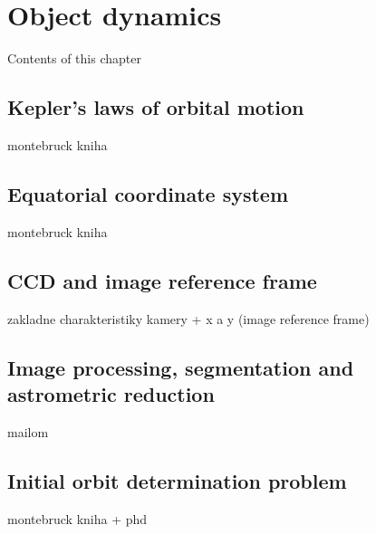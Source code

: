 \chapter{Object dynamics}\label{chap:object_dynamics}

	Contents of this chapter 

\section{Kepler's laws of orbital motion}\label{sec:kepler}
montebruck kniha

\section{Equatorial coordinate system}\label{sec:ra_dec}
montebruck kniha

\section{CCD and image reference frame}\label{sec:ccd}
zakladne charakteristiky kamery + x a y (image reference frame)

\section{Image processing, segmentation and astrometric reduction}\label{sec:proc_seg_reduc}
mailom

\section{Initial orbit determination problem}\label{sec:init_orbit_det}
montebruck kniha + phd